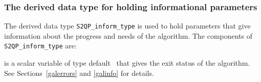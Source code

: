 \documentclass{galahad}
\newcommand{\packagename}{S2QP}
\begin{document}
\begin{description}
\end{description}


\subsubsection{The derived data type for holding informational
 parameters}\label{typeinform}
The derived data type 
{\tt \packagename\_inform\_type} 
is used to hold parameters that give information about the progress and needs 
of the algorithm. The components of
{\tt \packagename\_inform\_type} 
are:

\begin{description}
 is a scalar variable of type default \integer\ that gives the
exit status of the algorithm. See Sections~\ref{galerrors} and \ref{galinfo}
for details.
\end{description}

\end{document}

